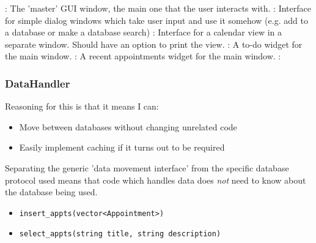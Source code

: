 \begin{itemize}
    : The 'master' GUI window, the main one that the
        user interacts with.
    : Interface for simple dialog windows
        which take user input and use it somehow (e.g. add to a database or make
        a database search)
    : Interface for a calendar view in a separate
        window. Should have an option to print the view.
    : A to-do widget for the main window.
    : A recent appointments widget for the main
    window.
    :
\end{itemize}


\subsubsection{DataHandler}

Reasoning for this is that it means I can:

\begin{itemize}
    \item Move between databases without changing unrelated code
    \item Easily implement caching if it turns out to be required
\end{itemize}

Separating the generic 'data movement interface' from the specific database
protocol used means that code which handles data does \textit{not} need to know
about the database being used.

\begin{itemize}
    \item \verb+insert_appts(vector<Appointment>)+
    \item \verb+select_appts(string title, string description)+
\end{itemize}
